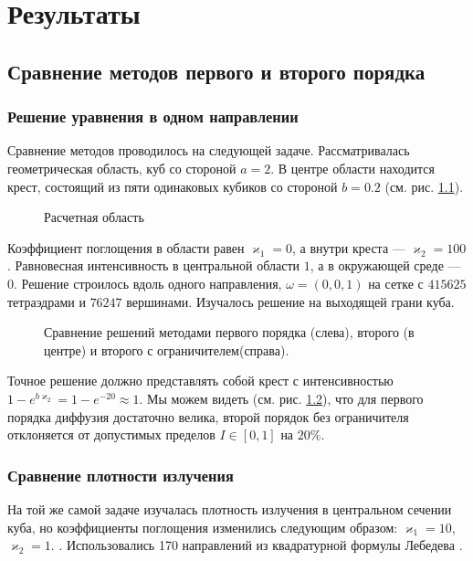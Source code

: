 \chapter{Результаты}

\section{Сравнение методов первого и второго порядка}
\subsection{Решение уравнения в одном направлении}
Сравнение методов проводилось на следующей задаче. Рассматривалась
геометрическая область, куб со стороной $a = 2$. В центре области находится
крест, состоящий из пяти одинаковых кубиков со стороной $b = 0.2$ (см. рис. \ref{fig:6}).
\begin{figure}[ht!]
\caption{Расчетная область}
\label{fig:6}
\end{figure}
Коэффи\-циент поглощения в области равен $\varkappa_1=0$, а внутри креста --- $\varkappa_2 = 100$. Равновесная интенсивность в центральной области $1$, а в окружающей среде --- $0$. Решение строилось вдоль одного направления, $\omega = (0,0,1)$ на сетке с $415625$ тетраэдрами и $76247$ вершинами. Изучалось решение на выходящей грани куба. 
\begin{figure}[ht!]
\caption{Сравнение решений методами первого порядка (слева), второго (в центре) и второго с ограничителем(справа).}
\label{fig:7}
\end{figure}

Точное решение должно представлять собой крест с интенсивностью $1 -
e^{b\varkappa_2} = 1-e^{-20} \approx 1$. Мы можем видеть (см. рис. \ref{fig:7}), что для первого порядка диффузия достаточно велика, второй порядок без ограничителя отклоняется от допустимых пределов $I \in [0, 1]$ на $20 \%$.
\subsection{Сравнение плотности излучения}
На той же самой задаче изучалась плотность излучения в центральном сечении куба, но коэффициенты поглощения изменились следующим образом: $\varkappa_1 = 10$, $\varkappa_2 = 1$. . Использовались 170 направлений из квадратурной формулы Лебедева \cite{lebedev_1999}. 

